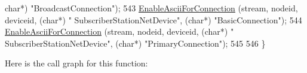 \begin{DoxyCode}
{      char}*) \textcolor{stringliteral}{"BroadcastConnection"});
543   \hyperlink{classns3_1_1WimaxHelper_a8d815ff3b909964ceb84feb9a688f9d5}{EnableAsciiForConnection} (stream, nodeid, deviceid, (\textcolor{keywordtype}{char}*) \textcolor{stringliteral}{"
      SubscriberStationNetDevice"}, (\textcolor{keywordtype}{char}*) \textcolor{stringliteral}{"BasicConnection"});
544   \hyperlink{classns3_1_1WimaxHelper_a8d815ff3b909964ceb84feb9a688f9d5}{EnableAsciiForConnection} (stream, nodeid, deviceid, (\textcolor{keywordtype}{char}*) \textcolor{stringliteral}{"
      SubscriberStationNetDevice"}, (\textcolor{keywordtype}{char}*) \textcolor{stringliteral}{"PrimaryConnection"});
545 
546 \}
\end{DoxyCode}


Here is the call graph for this function\+:


